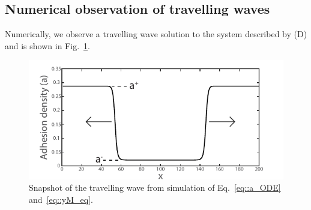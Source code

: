 \subsection{Numerical observation of travelling waves} Numerically, we observe a travelling wave solution  to the system described by (D) and is shown in Fig.~\ref{fig::A_wave}.
\begin{figure}[h]
\centering
\captionsetup{width=.9\linewidth}
\includegraphics[width=4.5in]{Project2/figs/A_wave.pdf}
\caption{Snapshot of the travelling wave from simulation of Eq.~\ref{eq::a_ODE} and~\ref{eq::yM_eq}.}
\label{fig::A_wave}
\end{figure}


